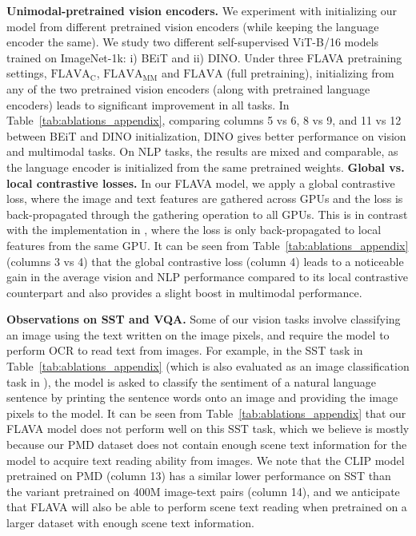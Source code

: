 \documentclass[10pt,twocolumn,letterpaper]{article}
\newcommand{\myparagraph}[1]{\vspace{0.25em}\noindent\textbf{#1}}
\begin{document}
\myparagraph{Unimodal-pretrained vision encoders.} We experiment with initializing our model from different pretrained vision encoders (while keeping the language encoder the same). We study two different self-supervised ViT-B/16 models trained on ImageNet-1k: i) BEiT and ii) DINO. Under three FLAVA pretraining settings, $\mathrm{FLAVA}_\mathrm{C}$, $\mathrm{FLAVA}_\mathrm{MM}$ and $\mathrm{FLAVA}$ (full pretraining), initializing from any of the two pretrained vision encoders (along with pretrained language encoders) leads to significant improvement in all tasks. In Table~\ref{tab:ablations_appendix}, comparing columns 5 vs 6, 8 vs 9, and 11 vs 12 between BEiT and DINO initialization, DINO gives better performance on vision and multimodal tasks. On NLP tasks, the results are mixed and comparable, as the language encoder is initialized from the same pretrained weights. 
\myparagraph{Global vs. local contrastive losses.} In our FLAVA model, we apply a global contrastive loss, where the image and text features are gathered across GPUs and the loss is back-propagated through the gathering operation to all GPUs. This is in contrast with the implementation in \cite{ilharco_gabriel_2021_5143773}, where the loss is only back-propagated to local features from the same GPU. It can be seen from Table~\ref{tab:ablations_appendix} (columns 3 vs 4) that the global contrastive loss (column 4) leads to a noticeable gain in the average vision and NLP performance compared to its local contrastive counterpart and also provides a slight boost in multimodal performance. 

\myparagraph{Observations on SST and VQA.} Some of our vision tasks involve classifying an image using the text written on the image pixels, and require the model to perform OCR to read text from images. For example, in the SST task in Table~\ref{tab:ablations_appendix} (which is also evaluated as an image classification task in \cite{radford2021learning}), the model is asked to classify the sentiment of a natural language sentence by printing the sentence words onto an image and providing the image pixels to the model. It can be seen from Table~\ref{tab:ablations_appendix} that our FLAVA model does not perform well on this SST task, which we believe is mostly because our PMD dataset does not contain enough scene text information for the model to acquire text reading ability from images. We note that the CLIP model pretrained on PMD (column 13) has a similar lower performance on SST than the variant pretrained on 400M image-text pairs (column 14), and we anticipate that FLAVA will also be able to perform scene text reading when pretrained on a larger dataset with enough scene text information.
\end{document}
